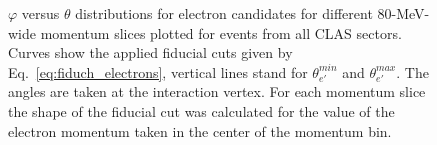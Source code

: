 \begin{figure}[htp]
\begin{center}
\caption{\small $\varphi$ versus $\theta$ distributions for electron candidates for different 80-MeV-wide momentum slices plotted for events from all CLAS sectors. Curves show the applied fiducial cuts given by Eq.~\eqref{eq:fiduch_electrons}, vertical lines stand for $\theta_{e'}^{min}$ and $\theta_{e'}^{max}$. The angles are taken at the interaction vertex. For each momentum slice the shape of the fiducial cut was calculated for the value of the electron momentum taken in the center of the momentum bin.  \label{fig:fiduch_el_2d}}
\end{center}
\end{figure}

\clearpage

